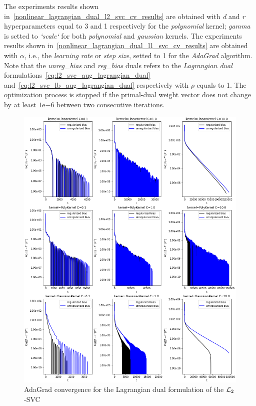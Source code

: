 The experiments results shown in~\ref{nonlinear_lagrangian_dual_l2_svc_cv_results} are obtained with \emph{d} and \emph{r} hyperparameters equal to 3 and 1 respectively for the \emph{polynomial} kernel; \emph{gamma} is setted to \emph{`scale`} for both \emph{polynomial} and \emph{gaussian} kernels. The experiments results shown in~\ref{nonlinear_lagrangian_dual_l1_svc_cv_results} are obtained with $\alpha$, i.e., the \emph{learning rate} or \emph{step size}, setted to 1 for the \emph{AdaGrad} algorithm. Note that the \emph{unreg\_bias} and \emph{reg\_bias} duals refers to the \emph{Lagrangian dual} formulations~\eqref{eq:l2_svc_aug_lagrangian_dual} and~\eqref{eq:l2_svc_lb_aug_lagrangian_dual} respectively with $\rho$ equals to 1. The optimization process is stopped if the primal-dual weight vector does not change by at least $1\mathrm{e}{-6}$  between two consecutive iterations.



\begin{figure}[H]
	\centering
	\includegraphics[scale=0.55]{img/lagrangian_dual_l2_svc_loss_history}
	\caption{AdaGrad convergence for the Lagrangian dual formulation of the $\protect \mathcal{L}_2$-SVC}
	\label{fig:lagrangian_dual_l2_svc_loss_history}
\end{figure}

